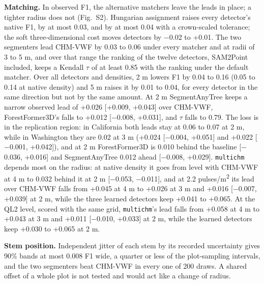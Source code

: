\documentclass[10pt]{article}
\begin{document}
\textbf{Matching.} In observed F1, the alternative matchers leave the leads in place;
a tighter radius does not (Fig.~S2). Hungarian assignment raises every
detector's native F1, by at most 0.03, and by at most 0.04 with a crown-scaled
tolerance; the soft three-dimensional cost moves detectors by $-$0.02 to +0.01.
The two segmenters lead CHM-VWF by 0.03 to 0.06 under every matcher and at radii
of 3 to 5 m, and over that range the ranking of the twelve detectors, SAM2Point
included, keeps a Kendall $\tau$ of at least 0.85 with the ranking under the default
matcher. Over all detectors and densities, 2 m lowers F1 by 0.04 to 0.16 (0.05
to 0.14 at native density) and 5 m raises it by 0.01 to 0.04, for every detector
in the same direction but not by the same amount. At 2 m SegmentAnyTree keeps a
narrow observed lead of +0.026 [+0.009, +0.043] over CHM-VWF, ForestFormer3D's
falls to +0.012 [$-$0.008, +0.031], and $\tau$ falls to 0.79. The loss is in the
replication region: in California both leads stay at 0.06 to 0.07 at 2 m, while
in Washington they are 0.02 at 3 m (+0.024 [$-$0.004, +0.051] and +0.022 [$-$0.001,
+0.042]), and at 2 m ForestFormer3D is 0.010 behind the baseline [$-$0.036,
+0.016] and SegmentAnyTree 0.012 ahead [$-$0.008, +0.029]. \texttt{multichm} depends most
on the radius: at native density it goes from level with CHM-VWF at 4 m to 0.032
behind it at 2 m [$-$0.053, $-$0.011], and at 2.2 pulses/m\textsuperscript{2} its lead over CHM-VWF
falls from +0.045 at 4 m to +0.026 at 3 m and +0.016 [$-$0.007, +0.039] at 2 m,
while the three learned detectors keep +0.041 to +0.065. At the QL2 level,
scored with the same grid, \texttt{multichm}'s lead falls from +0.058 at 4 m to +0.043
at 3 m and +0.011 [$-$0.010, +0.033] at 2 m, while the learned detectors keep
+0.030 to +0.065 at 2 m.

\textbf{Stem position.} Independent jitter of each stem by its recorded uncertainty
gives 90\% bands at most 0.008 F1 wide, a quarter or less of the plot-sampling
intervals, and the two segmenters beat CHM-VWF in every one of 200 draws. A
shared offset of a whole plot is not tested and would act like a change of
radius.
\end{document}
